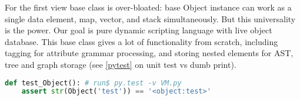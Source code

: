 \noindent
For the first view base class is over-bloated: base Object instance can work as
a single data element, map, vector, and stack simultaneously. But this
universality is the power. Our goal is pure dynamic scripting language with live
object database. This base class gives a lot of functionality from scratch,
including tagging for attribute grammar processing, and storing nested elements
for AST, tree and graph storage (see \ref{pytest} on unit test vs dumb print).

\begin{lstlisting}[language=Python]
def test_Object(): # run$ py.test -v VM.py
	assert str(Object('test')) == '<object:test>'
\end{lstlisting}

\secup